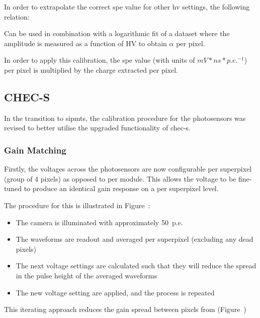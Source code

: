In order to extrapolate the correct \gls{spe} value for other \gls{hv} settings, the following relation:

Can be used in combination with a logarithmic  fit of a dataset where the amplitude is measured as a function of HV to obtain $\alpha$ per pixel. 


In order to apply this calibration, the \gls{spe} value (with units of $mV*ns*p.e.^{-1}$) per pixel is multiplied by the charge extracted per pixel. 

\subsection{CHEC-S}

In the transition to \glspl{sipmt}, the calibration procedure for the photosensors was revised to better utilise the upgraded functionality of \gls{chec-s}. 

\subsubsection{Gain Matching}

Firstly, the voltages across the photosensors are now configurable per superpixel (group of 4 pixels)  as opposed to per module. This allows the voltage to be fine-tuned to produce an identical gain response on a per superpixel level.

The procedure for this is illustrated in Figure~:
\begin{itemize}
	\item The camera is illuminated with approximately 50~p.e.
	\item The waveforms are readout and averaged per superpixel (excluding any dead pixels)
	\item The next voltage settings are calculated such that they will reduce the spread in the pulse height of the averaged waveforms
	\item The new voltage setting are applied, and the process is repeated
\end{itemize}
This iterating approach reduces the gain spread between pixels from  (Figure~)

